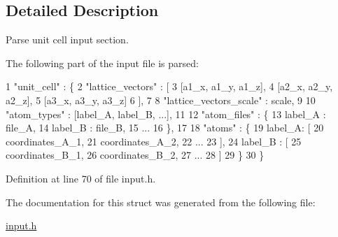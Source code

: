 \subsection{Detailed Description}
Parse unit cell input section. 

The following part of the input file is parsed\+: 
\begin{DoxyCode}
1 "unit\_cell" : \{
2     "lattice\_vectors" : [
3         [a1\_x, a1\_y, a1\_z],
4         [a2\_x, a2\_y, a2\_z],
5         [a3\_x, a3\_y, a3\_z]
6     ],
7 
8     "lattice\_vectors\_scale" : scale,
9 
10     "atom\_types" : [label\_A, label\_B, ...],
11 
12     "atom\_files" : \{
13         label\_A : file\_A, 
14         label\_B : file\_B,
15         ...
16     \},
17 
18     "atoms" : \{
19         label\_A: [
20             coordinates\_A\_1, 
21             coordinates\_A\_2,
22             ...
23         ],
24         label\_B : [
25             coordinates\_B\_1,
26             coordinates\_B\_2,
27             ...
28         ]
29     \}
30 \}
\end{DoxyCode}
 

Definition at line 70 of file input.\+h.



The documentation for this struct was generated from the following file\+:\begin{DoxyCompactItemize}
\item 
\hyperlink{input_8h}{input.\+h}\end{DoxyCompactItemize}
